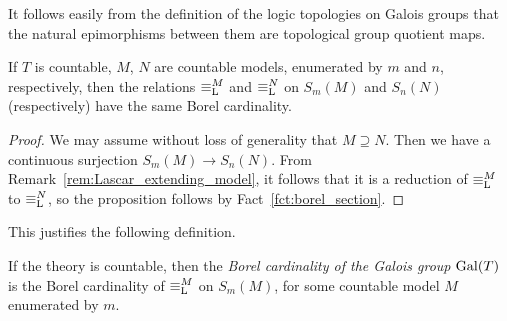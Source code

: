 	\begin{rem}
		It follows easily from the definition of the logic topologies on Galois groups that the natural epimorphisms between them are topological group quotient maps.\xqed{\lozenge}
	\end{rem}

	\begin{prop}
		If $T$ is countable, $M$, $N$ are countable models, enumerated by $m$ and $n$, respectively, then the relations $\equiv_{\mathrm{L}}^M$ and $\equiv_{\mathrm{L}}^N$ on $S_m(M)$ and $S_n(N)$ (respectively) have the same Borel cardinality.
	\end{prop}
	\begin{proof}
		We may assume without loss of generality that $M\supseteq N$. Then we have a continuous surjection $S_m(M)\to S_n(N)$. From Remark~\ref{rem:Lascar_extending_model}, it follows that it is a reduction of $\equiv_{\mathrm{L}}^M$ to $\equiv_{\mathrm{L}}^N$, so the proposition follows by Fact~\ref{fct:borel_section}.
	\end{proof}
	This justifies the following definition.
	\begin{dfn}
		\label{dfn:bcard_galois}
		If the theory is countable, then the \emph{Borel cardinality of the Galois group} $\operatorname{{Gal}}(T)$ is the Borel cardinality of $\equiv_{\mathrm{L}}^M$ on $S_m(M)$, for some countable model $M$ enumerated by $m$.\xqed{\lozenge}
	\end{dfn}
	
